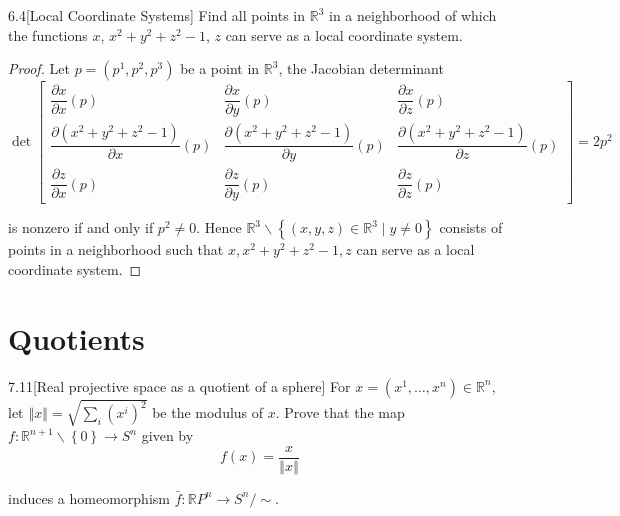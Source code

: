 \begin{problem}{6.4}[Local Coordinate Systems]
Find all points in \(\mathbb{R}^{3}\) in a neighborhood of which the functions \(x\), \(x^{2} + y^{2} + z^{2} - 1\), \(z\) can serve as a local coordinate system.
\end{problem}

\begin{proof}
	Let \( p = (p^{1}, p^{2}, p^{3}) \) be a point in \( \mathbb{R}^{3} \), the Jacobian determinant
	\[
		\det\begin{bmatrix}
			\dfrac{\partial x}{\partial x}(p)                           & \dfrac{\partial x}{\partial y}(p)                           & \dfrac{\partial x}{\partial z}(p)                           \\
			\dfrac{\partial (x^{2} + y^{2} + z^{2} - 1)}{\partial x}(p) & \dfrac{\partial (x^{2} + y^{2} + z^{2} - 1)}{\partial y}(p) & \dfrac{\partial (x^{2} + y^{2} + z^{2} - 1)}{\partial z}(p) \\
			\dfrac{\partial z}{\partial x}(p)                           & \dfrac{\partial z}{\partial y}(p)                           & \dfrac{\partial z}{\partial z}(p)
		\end{bmatrix} = 2p^{2}
	\]

	is nonzero if and only if \( p^{2} \ne 0 \). Hence \( \mathbb{R}^{3} \smallsetminus \left\{ (x, y, z) \in \mathbb{R}^{3} \mid y \ne 0 \right\} \) consists of points in a neighborhood such that \( x, x^{2} + y^{2} + z^{2} - 1, z \) can serve as a local coordinate system.
\end{proof}

\section{Quotients}

\begin{exercise}{7.11}[Real projective space as a quotient of a sphere]\label{exercise:7.11}
	For \( x = (x^{1}, \ldots, x^{n}) \in \mathbb{R}^{n} \), let \( \left\Vert x \right\Vert = \sqrt{\sum_{i}{(x^{i})}^{2}} \) be the modulus of \( x \). Prove that the map \( f: \mathbb{R}^{n+1}\smallsetminus \left\{0\right\} \to S^{n} \) given by
	\[
		f(x) = \dfrac{x}{\left\Vert x \right\Vert}
	\]

	induces a homeomorphism  \( \bar{f}: \mathbb{R}P^{n} \to S^{n}/\!\sim \).
\end{exercise}

